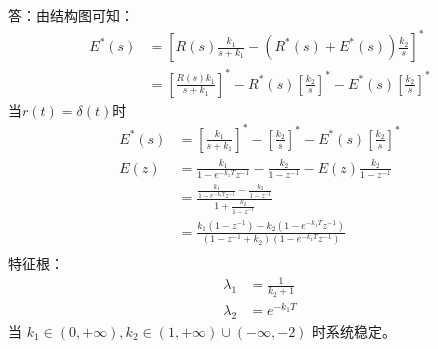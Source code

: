 {\onlyanswer
{
	答：由结构图可知：
	\begin{align*}
	E^*(s) &= \left[R(s)\frac{k_1}{s+k_1}-(R^*(s)+E^*(s))\frac{k_2}{s}\right]^* \\
	&=\left[\frac{R(s)k_1}{s+k_1}\right]^*-R^*(s)\left[\frac{k_2}{s}\right]^*-E^*(s)\left[\frac{k_2}{s}\right]^*
	\end{align*}
	当$r(t)=\delta(t)$时
	\begin{align*}
	E^*(s)&=\left[\frac{k_1}{s+k_1}\right]^*-\left[\frac{k_2}{s}\right]^*-E^*(s)\left[\frac{k_2}{s}\right]^*\\
	E(z)&=\frac{k_1}{1-e^{-k_1T}z^{-1}}-\frac{k_2}{1-z^{-1}}-E(z)\frac{k_2}{1-z^{-1}}\\
	&=\frac{\frac{k_1}{1-e^{-k_1T}z^{-1}}-\frac{k_2}{1-z^{-1}}}{1+\frac{k_2}{1-z^{-1}}}\\
	&=\frac{k_1(1-z^{-1})-k_2(1-e^{-k_1T}z^{-1})}{(1-z^{-1}+k_2)(1-e^{-k_1T}z^{-1})}\\
	\end{align*}
	特征根：
	\begin{align*}
	\lambda_1 &=\frac{1}{k_2+1}\\
	\lambda_2 &=e^{-k_1T}
	\end{align*}
	当 $k_1\in(0,+\infty),k_2\in(1,+\infty)\cup(-\infty,-2)$ 时系统稳定。
}

}

